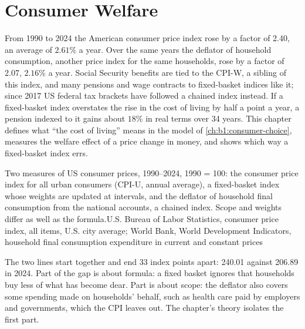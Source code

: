\chapter{Consumer Welfare}\label{ch:b1:consumer-welfare}

From 1990 to 2024 the American consumer price index rose by a factor of
2.40, an average of $2.61\%$ a year. Over the same years the deflator of
household consumption, another price index for the same households, rose
by a factor of 2.07, $2.16\%$ a year. %
Social Security benefits are tied to the CPI-W, a sibling of this index,
and many pensions and wage contracts to fixed-basket indices like
it; %
since 2017 US federal tax brackets have followed a chained index
instead. %
If a fixed-basket index
overstates the rise in the cost of living by half a point a year, a
pension indexed to it gains about $18\%$ in real terms over 34 years. This
chapter defines what ``the cost of living'' means in the model of
\cref{ch:b1:consumer-choice}, measures the welfare effect of a price change
in money, and shows which way a fixed-basket index errs.

\begin{openingchart}{Two measures of US consumer prices, 1990--2024, 1990 = 100:
the consumer price index for all urban consumers (CPI-U, annual average), a
fixed-basket index whose weights are updated at intervals, and the
deflator of household final consumption from the national accounts, a
chained index. Scope and weights differ as well as the
formula.}{U.S. Bureau of Labor Statistics, consumer price index, all
items, U.S. city average; World Bank, World Development Indicators,
household final consumption expenditure in current and constant prices}
\end{openingchart}

The two lines start together and end 33 index points apart: 240.01
against 206.89 in 2024. %
Part of the gap is about formula: a fixed basket ignores that households
buy less of what has become dear. Part is about scope: the deflator also covers
some spending made on households' behalf, such as health care paid by
employers and governments, which the CPI leaves out. The chapter's
theory isolates the first part.

